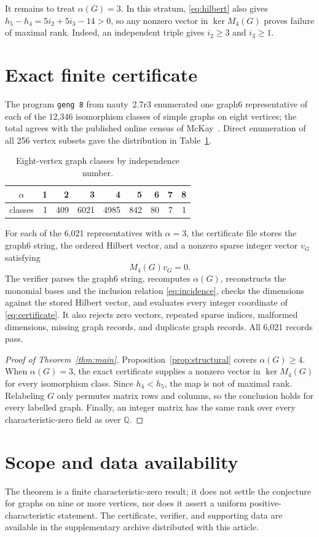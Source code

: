 \documentclass[11pt]{amsart}
\begin{document}
It remains to treat $\alpha(G)=3$. In this stratum, \eqref{eq:hilbert}
also gives $h_5-h_4=5i_2+5i_3-14>0$, so any nonzero vector in
$\ker M_4(G)$ proves failure of maximal rank. Indeed, an independent triple
gives $i_2\geq3$ and $i_3\geq1$.

\section{Exact finite certificate}
The program \texttt{geng 8} from nauty~2.7r3
\cite{McKay_2014,NautyGuide}
enumerated one graph6 representative of each of the 12,346 isomorphism
classes of simple graphs on eight vertices; the total agrees with the
published online census of McKay~\cite{McKayData}. Direct enumeration of all 256
vertex subsets gave the distribution in Table~\ref{tab:alpha}.
\begin{table}[ht]
\centering
\caption{Eight-vertex graph classes by independence number.}\label{tab:alpha}
\begin{tabular}{c@{\qquad}rrrrrrrr}
\toprule
$\alpha$&1&2&3&4&5&6&7&8\\
\midrule
classes&1&409&6021&4985&842&80&7&1\\
\bottomrule
\end{tabular}
\end{table}

For each of the 6,021 representatives with $\alpha=3$, the certificate file
stores the graph6 string, the ordered Hilbert vector, and a nonzero sparse
integer vector $v_G$ satisfying
\begin{equation}\label{eq:certificate}
 M_4(G)v_G=0.
\end{equation}
The verifier parses the graph6 string, recomputes $\alpha(G)$, reconstructs
the monomial bases and the inclusion relation \eqref{eq:incidence}, checks
the dimensions against the stored Hilbert vector, and evaluates every
integer coordinate of \eqref{eq:certificate}. It also rejects zero vectors,
repeated sparse indices, malformed dimensions, missing graph records, and
duplicate graph records. All 6,021 records pass.

\begin{proof}[Proof of Theorem~\ref{thm:main}]
Proposition~\ref{prop:structural} covers $\alpha(G)\geq4$. When
$\alpha(G)=3$, the exact certificate supplies a nonzero vector in
$\ker M_4(G)$ for every isomorphism class. Since $h_4<h_5$, the map is not
of maximal rank. Relabeling $G$ only permutes matrix rows and columns, so the
conclusion holds for every labelled graph. Finally, an integer matrix has
the same rank over every characteristic-zero field as over $\mathbb Q$.
\end{proof}

\section{Scope and data availability}
The theorem is a finite characteristic-zero result; it does not settle the
conjecture for graphs on nine or more vertices, nor does it assert a uniform
positive-characteristic statement. The certificate, verifier, and supporting
data are available in the supplementary archive distributed with this article.
\enlargethispage{7\baselineskip}


\end{document}
